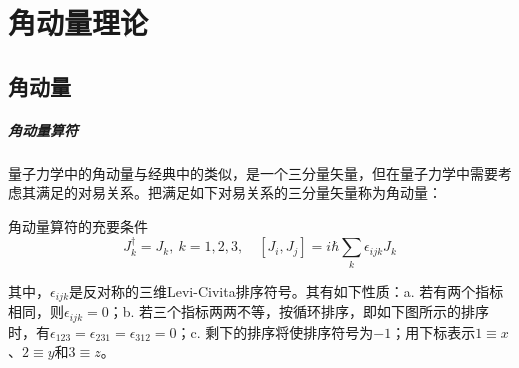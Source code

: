 \chapter{角动量理论}

\section{角动量}
\paragraph*{角动量算符} 
量子力学中的角动量与经典中的类似，是一个三分量矢量，但在量子力学中需要考虑其满足的对易关系。把满足如下对易关系的三分量矢量称为角动量：
\begin{theorem}{角动量算符的充要条件}
	\begin{equation}
		J^{\dagger}_k = J_k, ~ k = 1, 2, 3, \quad \left[J_i, J_j\right] = i\hbar \sum_{k} \epsilon_{ijk} J_k
	\end{equation}
\end{theorem}
其中，$\epsilon_{ijk}$是反对称的三维Levi-Civita排序符号。其有如下性质：a. 若有两个指标相同，则$\epsilon_{ijk} = 0$；b. 若三个指标两两不等，按循环排序，即如下图所示的排序时，有$\epsilon_{123} = \epsilon_{231} = \epsilon_{312} = 0$；c. 剩下的排序将使排序符号为$-1$；用下标表示$1 \equiv x$、$2 \equiv y$和$3 \equiv z$。
\begin{figure}[htbp]
	\centering
\end{figure}

